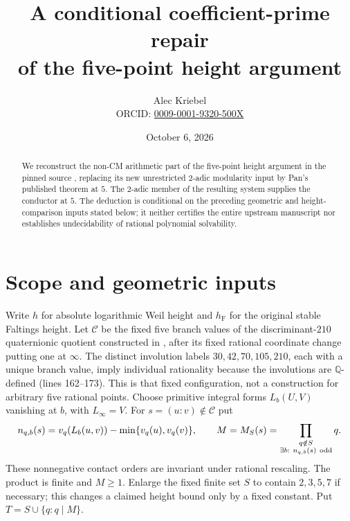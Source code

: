 \documentclass[11pt]{article}
\title{A conditional coefficient-prime repair\\of the five-point height argument}
\author{Alec Kriebel\\
\small ORCID: \href{https://orcid.org/0009-0001-9320-500X}{0009-0001-9320-500X}}
\date{October 6, 2026}
\newcommand{\Q}{\mathbb Q}
\newcommand{\hF}{h_{\mathrm F}}
\begin{document}
\maketitle
\begin{abstract}
We reconstruct the non-CM arithmetic part of the five-point height argument
in the pinned source \cite{Pinned}, replacing its new unrestricted
$2$-adic modularity input by Pan's published theorem at $5$.
The $2$-adic member of the resulting system supplies the conductor at $5$.
The deduction is conditional on the preceding geometric and height-comparison
inputs stated below; it neither certifies the entire upstream manuscript nor
establishes undecidability of rational polynomial solvability.
\end{abstract}

\section{Scope and geometric inputs}
Write $h$ for absolute logarithmic Weil height and $\hF$ for the original
stable Faltings height. Let $\mathcal C$ be the fixed five branch values
of the discriminant-$210$ quaternionic quotient constructed in \cite{Pinned},
after its fixed rational coordinate change putting one at $\infty$.
The distinct involution labels $30,42,70,105,210$, each with a unique
branch value, imply individual rationality because the involutions are
$\Q$-defined (lines 162--173). This is that fixed configuration, not a
construction for arbitrary five rational points. Choose primitive
integral forms $L_b(U,V)$ vanishing at $b$, with $L_\infty=V$.
For $s=(u:v)\notin\mathcal C$ put
\[
 n_{q,b}(s)=v_q(L_b(u,v))-\min\{v_q(u),v_q(v)\},\qquad
 M=M_S(s)=\prod_{\substack{q\notin S\\\exists b:\ n_{q,b}(s)\ {\rm odd}}}q.
\]
These nonnegative contact orders are invariant under rational rescaling.
The product is finite and $M\ge1$. Enlarge the fixed finite set $S$ to
contain $2,3,5,7$ if necessary; this changes a claimed height bound only
by a fixed constant. Put $T=S\cup\{q:q\mid M\}$.
\end{document}
